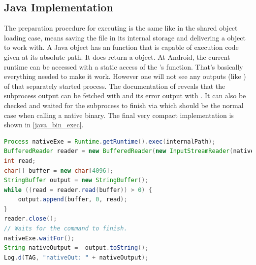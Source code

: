 \subsection{Java Implementation}\label{dyn_bin_java}
The preparation procedure for executing is the same like in the shared object loading
case, means saving the file in its internal storage and delivering a  object
to work with. A Java  object has an  function that is capable of execution code given at its absolute path. It does return a 
object. At Android, the current runtime can be accessed with a static access of the
's  function.
That's basically everything needed to make it work. However one will not see any
outputs (like ) of that separately started process.
The documentation of  reveals that the subprocess output can be
fetched with  and its error output with .
It can also be checked and waited for the subprocess to finish via 
which should be the normal case when calling a native binary. The final very
compact implementation is shown in \autoref{java_bin_exec}.
\begin{lstlisting}[language=Java, caption=Java Native Exec(), label=java_bin_exec]
Process nativeExe = Runtime.getRuntime().exec(internalPath);
BufferedReader reader = new BufferedReader(new InputStreamReader(nativeExe.getInputStream()));
int read;
char[] buffer = new char[4096];
StringBuffer output = new StringBuffer();
while ((read = reader.read(buffer)) > 0) {
    output.append(buffer, 0, read);
}
reader.close();
// Waits for the command to finish.
nativeExe.waitFor();
String nativeOutput =  output.toString();
Log.d(TAG, "nativeOut: " + nativeOutput);
\end{lstlisting}

